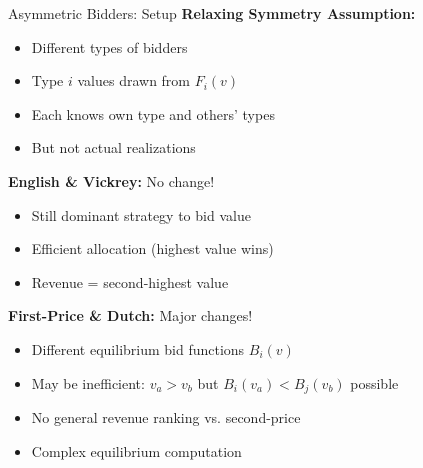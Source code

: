 \documentclass[xcolor={x11names}]{beamer}
\begin{document}
\begin{frame}{Asymmetric Bidders: Setup}
\textbf{Relaxing Symmetry Assumption:}
\begin{itemize}
  \item Different types of bidders
  \item Type $i$ values drawn from $F_i(v)$
  \item Each knows own type and others' types
  \item But not actual realizations
\end{itemize}


\textbf{English \& Vickrey:} No change!
\begin{itemize}
  \item Still dominant strategy to bid value
  \item Efficient allocation (highest value wins)
  \item Revenue = second-highest value
\end{itemize}


\textbf{First-Price \& Dutch:} Major changes!
\begin{itemize}
  \item Different equilibrium bid functions $B_i(v)$
  \item May be inefficient: $v_a > v_b$ but $B_i(v_a) < B_j(v_b)$ possible
  \item No general revenue ranking vs. second-price
  \item Complex equilibrium computation
\end{itemize}
\end{frame}
\end{document}
